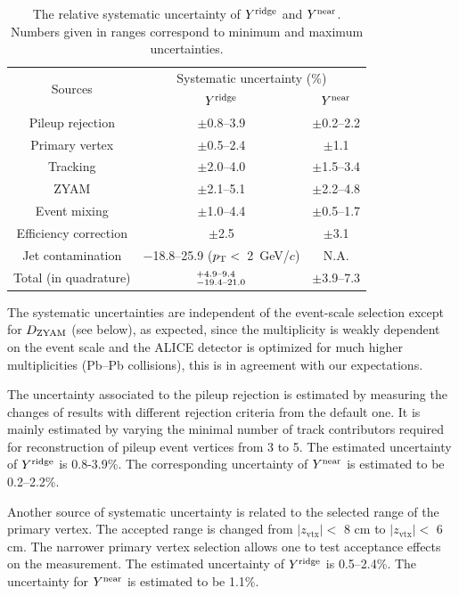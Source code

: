\begin{table}[h!]
\caption{The relative systematic uncertainty of $Y^{\rm{ridge}}$ and $Y^{\rm{near}}$. Numbers given in ranges correspond to minimum and maximum uncertainties.}
\centering
\begin{tabular}{c|cc}
\hline 
\multirow{2}{*}{Sources}  & \multicolumn{2}{c}{Systematic uncertainty (\%)} \\\cline{2-3} 
         & $Y^{\rm{ridge}}$ & $Y^{\rm{near}}$ \\ \hline 
Pileup rejection    	& $\pm$0.8--3.9    &$\pm$0.2--2.2	\\ 
Primary vertex	        & $\pm$0.5--2.4	   &$\pm$1.1	\\ 
Tracking		        & $\pm$2.0--4.0    &$\pm$1.5--3.4	\\ 
ZYAM		        	& $\pm$2.1--5.1	   &$\pm$2.2--4.8	\\ 
Event mixing	    	& $\pm$1.0--4.4	   &$\pm$0.5--1.7	\\ 
Efficiency correction	& $\pm$2.5 	    &$\pm$3.1	\\  
Jet contamination   	& $-$18.8--25.9 ($p_\mathrm{T}<$~2~GeV/$c$)	&N.A.	\\ \hline 
Total (in quadrature)			& $^{+\rm{4.9}\textrm{--}\rm{9.4}}_{-\rm{19.4}\textrm{--}\rm{21.0}}$ & $\pm$3.9--7.3 \\ 
\hline 
\end{tabular}
\label{tab:syst}
\end{table}

The systematic uncertainties are independent of the event-scale selection except for $D_{\rm{ZYAM}}$ (see below), as expected, since the multiplicity is weakly dependent on the event scale and the ALICE detector is optimized for much higher multiplicities (Pb--Pb collisions), this is in agreement with our expectations.

The uncertainty associated to the pileup rejection is estimated by measuring the changes of results with different rejection criteria from the default one. It is mainly estimated by varying the minimal number of track contributors required for reconstruction of pileup event vertices from 3 to 5. The estimated uncertainty of $Y^{\rm{ridge}}$ is 0.8-3.9\%. The corresponding uncertainty of $Y^{\rm{near}}$ is estimated to be 0.2--2.2\%.
 
Another source of systematic uncertainty is related to the selected range of the primary vertex. The accepted range is changed from $|z_\mathrm{vtx}|<$ 8 cm to $|z_\mathrm{vtx}|<$ 6 cm. The narrower primary vertex selection allows one to test acceptance effects on the measurement. The estimated uncertainty of $Y^{\rm{ridge}}$ is 0.5--2.4\%. The uncertainty for $Y^{\rm{near}}$ is estimated to be 1.1\%.

